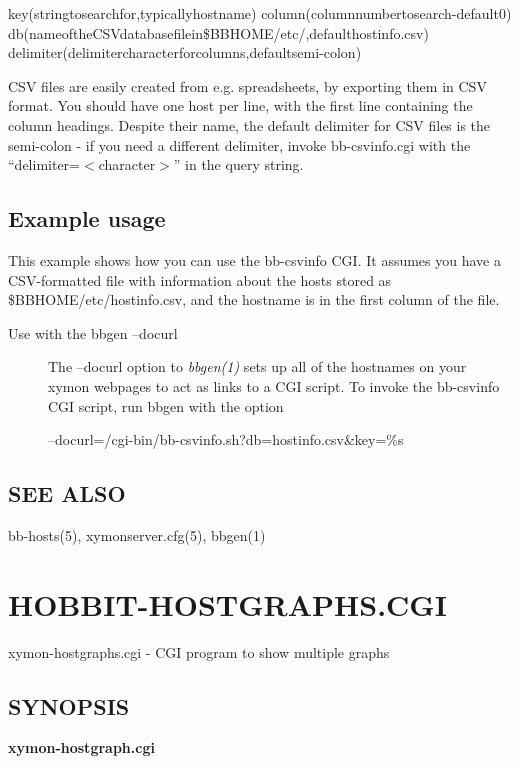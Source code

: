   
key(stringtosearchfor,typicallyhostname)  
column(columnnumbertosearch-default0)  
db(nameoftheCSVdatabasefilein\$BBHOME/etc/,defaulthostinfo.csv)  
delimiter(delimitercharacterforcolumns,defaultsemi-colon) 


  CSV files are easily created from e.g. spreadsheets, by exporting
  them in CSV format. You should have one host per line, with the
  first line containing the column headings. Despite their name, the
  default delimiter for CSV files is the semi-colon - if you need a
  different delimiter, invoke bb-csvinfo.cgi with the
  ``delimiter=$<$character$>$'' in the query string. 



 
\subsection{Example usage}
 This example shows how you can use the bb-csvinfo CGI. It assumes you
 have a CSV-formatted file with information about the hosts stored as
 \$BBHOME/etc/hostinfo.csv, and the hostname is in the first column of
 the file. 


 \begin{description}
\item[Use with the bbgen --docurl] The --docurl option to \emph{bbgen(1)}
 sets up all of the hostnames on your xymon webpages to act as links
 to a CGI script. To invoke the bb-csvinfo CGI script, run bbgen with
 the option 


  
--docurl=/cgi-bin/bb-csvinfo.sh?db=hostinfo.csv\&key=\%s 



\end{description}

\subsection{SEE ALSO}
bb-hosts(5), xymonserver.cfg(5), bbgen(1) 

 
%
\newpage
\section{HOBBIT-HOSTGRAPHS.CGI}
 xymon-hostgraphs.cgi - CGI program to show multiple graphs 

\subsection{SYNOPSIS}
\textbf{xymon-hostgraph.cgi}


